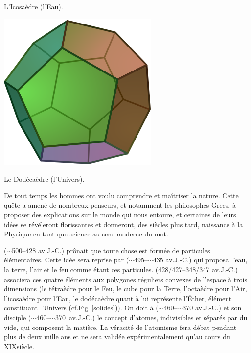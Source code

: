 {\vspace*{-0.25cm}
\begin{center}\normalfont\footnotesize {L'Icosaèdre (l'Eau).}\end{center}
\vspace*{-0.25cm}
\includegraphics[width=0.25\marginparwidth]{SM/Dodecahedron.png}
\vspace*{-0.25cm}
\begin{center}\normalfont\footnotesize {Le Dodécaèdre (l'Univers).}\end{center}
\vspace*{-0.25cm}
\label{solides}
}
De tout temps les hommes ont voulu comprendre et maîtriser la nature. Cette quête a amené de nombreux penseurs, et notamment les philosophes Grecs, à proposer des explications sur le monde qui nous entoure, et certaines de leurs idées se révéleront florissantes et donneront, des siècles plus tard, naissance à la Physique en tant que science au sens moderne du mot. 

 ($\sim$\num{500}--\num{428} av.J.-C.) prônait que toute chose est formée de particules élémentaires. Cette idée sera reprise par  ($\sim$\num{495}--$\sim$\num{435} av.J.-C.) qui proposa l'eau, la terre, l'air et le feu comme étant ces particules.  (\num{428}/\num{427}--\num{348}/\num{347} av.J.-C.) associera ces quatre éléments aux polygones réguliers convexes de l'espace à trois dimensions (le tétraèdre pour le Feu, le cube pour la Terre, l'octaèdre pour l'Air, l'icosaèdre pour l'Eau, le dodécaèdre quant à lui représente l'Éther, élément constituant l'Univers (cf.Fig~\ref{solides})). On doit à  ($\sim$\num{460}--$\sim$\num{370} av.J.-C.) et son disciple  \hbox{($\sim$\num{460}--$\sim$\num{370} av.J.-C.)} le concept d'atomes, indivisibles et séparés par du vide, qui composent la matière. La véracité de l'atomisme fera débat pendant plus de deux mille ans et ne sera validée expérimentalement qu'au cours du XIX\ieme siècle.

